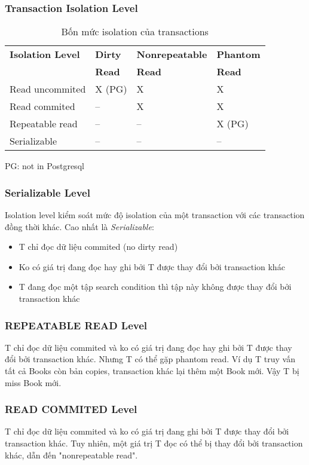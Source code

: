 \documentclass[xcolor={table, dvipsnames}]{beamer}
\begin{document}
\begin{frame}
\frametitle{Transaction Isolation Level}
\begin{table}
\begin{tabular}{|l|l|l|l|}
\hline 
\textbf{Isolation Level} & \textbf{Dirty} & \textbf{Nonrepeatable} & \textbf{Phantom} \\ 
 & \textbf{Read} & \textbf{Read} & \textbf{Read} \\
\hline 
Read uncommited & X (PG) & X & X \\ 
\hline 
Read commited & -- & X & X \\ 
\hline 
Repeatable read & -- & -- & X (PG) \\ 
\hline 
Serializable & -- & -- & -- \\ 
\hline 
\end{tabular} 
\caption{Bốn mức isolation của transactions}
\end{table}
PG: not in Postgresql
\end{frame}

\begin{frame}
\frametitle{Serializable Level}
Isolation level kiểm soát mức độ isolation của một transaction với các transaction đồng thời khác. Cao nhất là \textit{Serializable}:
\begin{itemize}
\item T chỉ đọc dữ liệu commited (no dirty read)
\item Ko có giá trị đang đọc hay ghi bởi T được thay đổi bởi transaction khác
\item T đang đọc một tập search condition thì tập này không được thay đổi bởi transaction khác
\end{itemize}
\end{frame}

\begin{frame}
\frametitle{REPEATABLE READ Level}
T chỉ đọc dữ liệu commited và ko có giá trị đang đọc hay ghi bởi T được thay đổi bởi transaction khác. Nhưng T có thể gặp phantom read. Ví dụ T truy vấn tất cả Books còn bản copies, transaction khác lại thêm một Book mới. Vậy T bị miss Book mới.
\end{frame}

\begin{frame}
\frametitle{READ COMMITED Level}
T chỉ đọc dữ liệu commited và ko có giá trị đang ghi bởi T được thay đổi bởi transaction khác. Tuy nhiên, một giá trị T đọc có thể bị thay đổi bởi transaction khác, dẫn đến "nonrepeatable read".
\end{frame}
\end{document}

